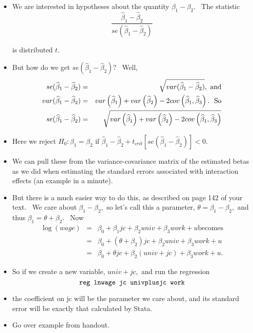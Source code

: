 \documentclass[11pt]{article}
\begin{document}
\begin{itemize}
\item We are interested in hypotheses about the quantity $\beta _{1}-\beta
_{2}.$ \ The statistic 
\begin{equation*}
\frac{\widehat{\beta }_{1}-\widehat{\beta }_{2}}{se(\widehat{\beta }_{1}-%
\widehat{\beta }_{2})}
\end{equation*}

is distributed $t.$ \ 

\item But how do we get $se(\widehat{\beta }_{1}-\widehat{\beta }_{2})?$ \
Well,%
\begin{eqnarray*}
se(\widehat{\beta }_{1}-\widehat{\beta }_{2}) &=&\sqrt{var(\widehat{\beta }%
_{1}-\widehat{\beta }_{2})},\text{ and} \\
var(\widehat{\beta }_{1}-\widehat{\beta }_{2}) &=&var\left( \widehat{\beta }%
_{1}\right) +var\left( \widehat{\beta }_{2}\right) -2cov\left( \widehat{%
\beta }_{1},\widehat{\beta }_{3}\right) .\text{ \ So} \\
se(\widehat{\beta }_{1}-\widehat{\beta }_{2}) &=&\sqrt{var\left( \widehat{%
\beta }_{1}\right) +var\left( \widehat{\beta }_{2}\right) -2cov\left( 
\widehat{\beta }_{1},\widehat{\beta }_{3}\right) }
\end{eqnarray*}

\item Here we reject $H_{0}:\beta _{1}=\beta _{2}$ if $\widehat{\beta }_{1}-%
\widehat{\beta }_{2}+t_{crit}\left[ se(\widehat{\beta }_{1}-\widehat{\beta }%
_{2})\right] <0.$

\item We can pull these from the variance-covariance matrix of the estimated
betas as we did when estimating the standard errors associated with
interaction effects (an example in a minute).

\item But there is a much easier way to do this, as described on page 142 of
your text. \ We care about $\beta _{1}-\beta _{2},$ so let's call this a
parameter, $\theta =\beta _{1}-\beta _{2},$ and thus $\beta _{1}=\theta
+\beta _{2}.$ \ Now%
\begin{eqnarray*}
\log (wage) &=&\beta _{0}+\beta _{1}jc+\beta _{2}univ+\beta _{3}work+u\text{
\ becomes} \\
&=&\beta _{0}+\left( \theta +\beta _{2}\right) jc+\beta _{2}univ+\beta
_{3}work+u \\
&=&\beta _{0}+\theta jc+\beta _{2}\left( univ+jc\right) +\beta _{3}work+u.
\end{eqnarray*}

\item So if we create a new variable, $univ+jc,$ and run the regression%
\begin{equation*}
\text{\texttt{reg lnwage jc univplusjc work}}
\end{equation*}

\item the coefficient on jc will be the parameter we care about, and its
standard error will be exactly that calculated by Stata.

\item Go over example from handout.
\end{itemize}
\end{document}

